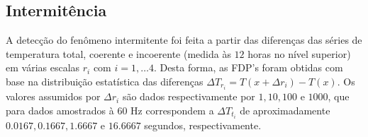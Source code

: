 \begin{figure}[ht]
	\label{figespectrotS0681200}
\end{figure}

\subsection{Intermitência}

A detecção do fenômeno intermitente foi feita a partir das diferenças das séries de temperatura total, coerente e incoerente (medida às $12$ horas no nível superior) em várias escalas $r_{i}$ com $i=1,\ldots4$. Desta forma, as FDP's foram obtidas com base na distribuição estatística das diferenças $\Delta T_{r_{i}}=T(x+\Delta r_{i})-T(x)$. Os valores assumidos por $\Delta r_{i}$ são dados respectivamente por $1,10,100$ e $1000$, que para dados amostrados à $60$ Hz correspondem a $\Delta T_{t_{i}}$ de aproximadamente $0.0167,0.1667,1.6667$ e $16.6667$ segundos, respectivamente.